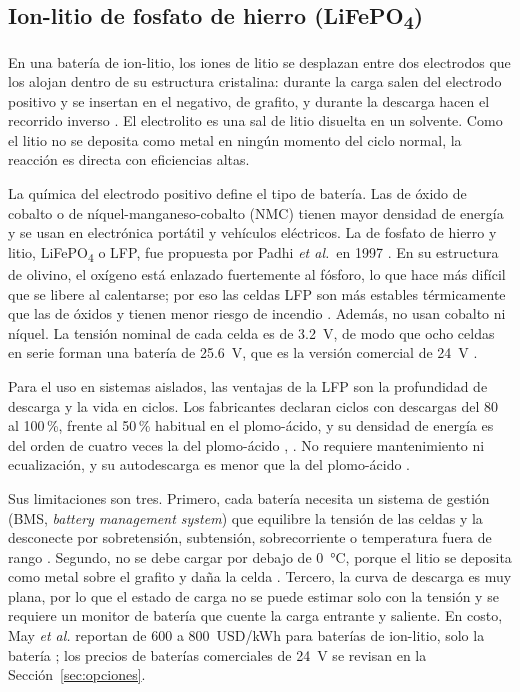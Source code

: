 \subsection{Ion-litio de fosfato de hierro (LiFePO\textsubscript{4})}

En una batería de ion-litio, los iones de litio se desplazan entre dos electrodos que los alojan dentro de su estructura cristalina: durante la carga salen del electrodo positivo y se insertan en el negativo, de grafito, y durante la descarga hacen el recorrido inverso \cite{tarascon2001}. El electrolito es una sal de litio disuelta en un solvente. Como el litio no se deposita como metal en ningún momento del ciclo normal, la reacción es directa con eficiencias altas.

La química del electrodo positivo define el tipo de batería. Las de óxido de cobalto o de níquel-manganeso-cobalto (NMC) tienen mayor densidad de energía y se usan en electrónica portátil y vehículos eléctricos. La de fosfato de hierro y litio, LiFePO\textsubscript{4} o LFP, fue propuesta por Padhi \emph{et al.}\ en 1997 \cite{padhi1997}. En su estructura de olivino, el oxígeno está enlazado fuertemente al fósforo, lo que hace más difícil que se libere al calentarse; por eso las celdas LFP son más estables térmicamente que las de óxidos y tienen menor riesgo de incendio \cite{zubi2018}. Además, no usan cobalto ni níquel. La tensión nominal de cada celda es de \SI{3.2}{V}, de modo que ocho celdas en serie forman una batería de \SI{25.6}{V}, que es la versión comercial de \SI{24}{V} \cite{linden}.

Para el uso en sistemas aislados, las ventajas de la LFP son la profundidad de descarga y la vida en ciclos. Los fabricantes declaran ciclos con descargas del 80 al 100\,\%, frente al 50\,\% habitual en el plomo-ácido, y su densidad de energía es del orden de cuatro veces la del plomo-ácido \cite{may2018}, \cite{zubi2018}. No requiere mantenimiento ni ecualización, y su autodescarga es menor que la del plomo-ácido \cite{linden}.

Sus limitaciones son tres. Primero, cada batería necesita un sistema de gestión (BMS, \emph{battery management system}) que equilibre la tensión de las celdas y la desconecte por sobretensión, subtensión, sobrecorriente o temperatura fuera de rango \cite{linden}. Segundo, no se debe cargar por debajo de \SI{0}{\celsius}, porque el litio se deposita como metal sobre el grafito y daña la celda \cite{linden}. Tercero, la curva de descarga es muy plana, por lo que el estado de carga no se puede estimar solo con la tensión y se requiere un monitor de batería que cuente la carga entrante y saliente. En costo, May \emph{et al.} reportan de 600 a \SI{800}{USD/kWh} para baterías de ion-litio, solo la batería \cite{may2018}; los precios de baterías comerciales de \SI{24}{V} se revisan en la Sección~\ref{sec:opciones}.

